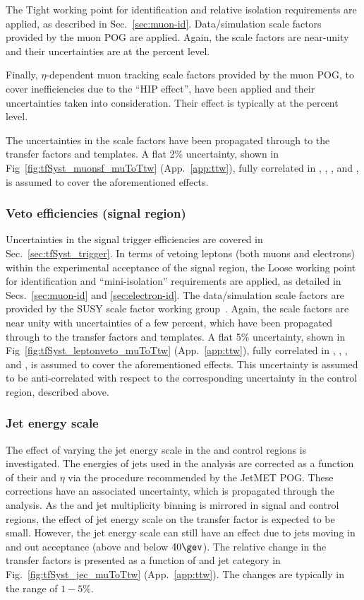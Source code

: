 The Tight working point for identification and relative isolation
requirements are applied, as described in
Sec.~\ref{sec:muon-id}. Data/simulation scale factors provided by the
muon POG are applied. Again, the scale factors are near-unity and
their uncertainties are at the percent level.

Finally, $\eta$-dependent muon tracking scale factors provided by the
muon POG, to cover inefficiencies due to the ``HIP effect'', have been
applied and their uncertainties taken into consideration. Their effect
is typically at the percent level. 

The uncertainties in the scale factors have been propagated through to
the transfer factors and \mht templates. A flat 2\% uncertainty, shown
in Fig~\ref{fig:tfSyst_muonsf_muToTtw} (App.~\ref{app:ttw}), fully
correlated in \njet, \scalht, \nb, and \mht, is assumed to cover the
aforementioned effects.

\subsubsection*{Veto efficiencies (signal region)}

Uncertainties in the signal trigger efficiencies are covered in
Sec.~\ref{sec:tfSyst_trigger}. In terms of vetoing leptons (both muons
and electrons) within the experimental acceptance of the signal
region, the Loose working point for identification and
``mini-isolation'' requirements are applied, as detailed in
Secs.~\ref{sec:muon-id} and \ref{sec:electron-id}. The data/simulation
scale factors are provided by the SUSY scale factor working
group~\cite{twiki-leptonSF}. Again, the scale factors are near unity
with uncertainties of a few percent, which have been propagated
through to the transfer factors and \mht templates. A flat 5\%
uncertainty, shown in Fig~\ref{fig:tfSyst_leptonveto_muToTtw}
(App.~\ref{app:ttw}), fully correlated in \njet, \scalht, \nb, and
\mht, is assumed to cover the aforementioned effects. This uncertainty
is assumed to be anti-correlated with respect to the corresponding
uncertainty in the \mj control region, described above. 

\subsubsection{Jet energy scale}
\label{sec:tfSyst_jec}

The effect of varying the jet energy scale in the \mj and \mmj control
regions is investigated.  The energies of jets used in the analysis
are corrected as a function of their \pt and $\eta$ via the procedure
recommended by the JetMET POG. These corrections have an associated
uncertainty, which is propagated through the analysis.  As the \scalht
and jet multiplicity binning is mirrored in signal and control
regions, the effect of jet energy scale on the transfer factor is
expected to be small.  However, the jet energy scale can still have an
effect due to jets moving in and out acceptance (above and below
$40\gev$). The relative change in the transfer factors is presented as
a function of \scalht and jet category in
Fig.~\ref{fig:tfSyst_jec_muToTtw} (App.~\ref{app:ttw}). The changes
are typically in the range of $1-5\%$.

